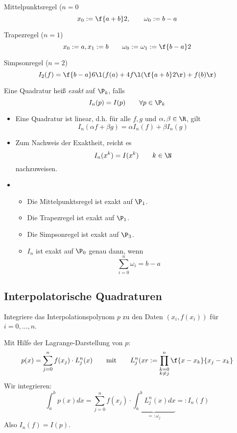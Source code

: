 \documentclass[a4paper,11pt]{scrartcl}
\begin{document}
\begin{ex*}
	\begin{seg}{Mittelpunktsregel ($n=0$}
		\[
			x_0 := \f {a+b}2, \qquad \omega_0 := b-a
		\]				
	\end{seg}
	\begin{seg}{Trapezregel ($n=1$)}
		\[
			x_0 := a, x_1 := b \qquad \omega_0 := \omega_1 := \f {b-a}2
		\]				
	\end{seg}
	\begin{seg}{Simpsonregel ($n=2$)}
		\[
			I_2(f) = \f {b-a}6 \l( f(a) + 4f\l(\f {a+b}2\r) + f(b) \r)
		\]
	\end{seg}
\end{ex*}

\begin{df*}[Exaktheit]
	Eine Quadratur heiß \emph{exakt} auf $\P_k$, falls
	\[
		I_n(p) = I(p) \qquad \forall p\in \P_k
	\]
\end{df*}

\begin{nt*}
	\begin{itemize}
		\item
			Eine Quadratur ist linear, d.h. für alle $f,g$ und $\alpha,\beta \in \R$, gilt
			\[
				I_n ( \alpha f + \beta g) = \alpha I_n(f) + \beta I_n(g)
			\]
		\item
			Zum Nachweis der Exaktheit, reicht es
			\[
				I_n(x^k) = I(x^k) \qquad k\in \N
			\]
			nachzuweisen.
		\item
			\begin{itemize}
				\item
					Die Mittelpunktsregel ist exakt auf $\P_1$.
				\item
					Die Trapezregel ist exakt auf $\P_1$.
				\item
					Die Simpsonregel ist exakt auf $\P_3$.
				\item
					$I_n$ ist exakt auf $\P_0$ genau dann, wenn
					\[
						\sum_{i=0}^n \omega_i = b-a
					\]
			\end{itemize}
	\end{itemize}
\end{nt*}


\subsection{Interpolatorische Quadraturen}

Integriere das Interpolationspolynom $p$ zu den Daten $(x_i,f(x_i))$ für $i=0,\dotsc,n$.

Mit Hilfe der Lagrange-Darstellung von $p$:
\[
	p(x) = \sum_{j=0}^n f(x_j) \cdot L_j^n (x) \qquad \text{mit} \qquad L_j^n(xr := \prod_{\substack{k=0\\k\neq j}}^n \f{x-x_k}{x_j-x_k}
\]
Wir integrieren:
\[
	\int_a^b p(x) dx = \sum_{j=0}^n f(x_j) \cdot \underbrace{\int_a^b L_j^n (x) dx}_{=:\omega_j} =: I_n(f)
\]
Also $I_n(f) = I(p)$.
\end{document}
